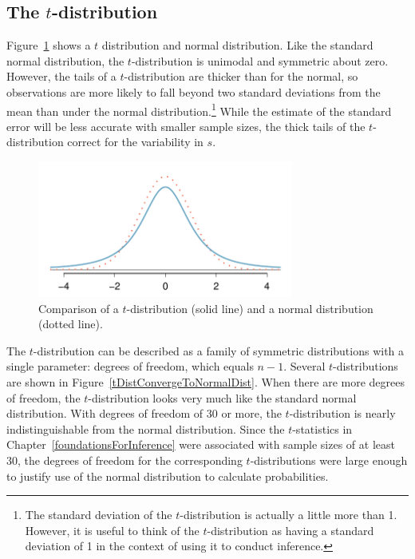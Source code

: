 \subsection{The $t$-distribution}
\label{introducingTheTDistribution}


Figure~\ref{tDistCompareToNormalDist} shows a $t$ distribution and normal distribution. Like the standard normal distribution, the $t$-distribution is unimodal and symmetric about zero.  However, the tails of a $t$-distribution are thicker than for the normal, so observations are more likely to fall beyond two standard deviations from the mean than under the normal distribution.\footnote{The standard deviation of the $t$-distribution is actually a little more than 1. However, it is useful to think of the $t$-distribution as having a standard deviation of 1 in the context of using it to conduct inference.} While the estimate of the standard error will be less accurate with smaller sample sizes, the thick tails of the $t$-distribution correct for the variability in $s$.

\begin{figure}
\centering
\includegraphics[height=45mm]{ch_inference_for_means_oi_biostat/figures/tDistCompareToNormalDist/tDistCompareToNormalDist}
\caption{Comparison of a $t$-distribution (solid line) and a normal distribution (dotted line).}
\label{tDistCompareToNormalDist}
\end{figure}

The $t$-distribution can be described as a family of symmetric distributions with a single parameter: degrees of freedom, which equals $n - 1$. Several $t$-distributions are shown in Figure~\ref{tDistConvergeToNormalDist}. When there are more degrees of freedom, the $t$-distribution looks very much like the standard normal distribution. With degrees of freedom of 30 or more, the $t$-distribution is nearly indistinguishable from the normal distribution. Since the $t$-statistics in Chapter~\ref{foundationsForInference} were associated with sample sizes of at least 30, the degrees of freedom for the corresponding $t$-distributions were large enough to justify use of the normal distribution to calculate probabilities. 

